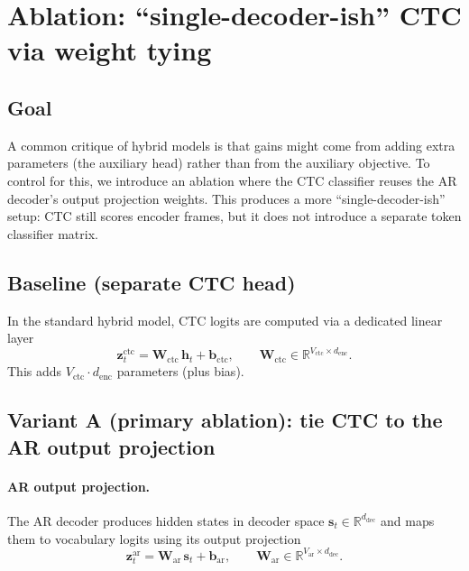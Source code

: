 \section{Ablation: ``single-decoder-ish'' CTC via weight tying}
\label{sec:ctc-weight-tying}

\subsection{Goal}
A common critique of hybrid models is that gains might come from adding extra parameters (the auxiliary head) rather than from the auxiliary objective.
To control for this, we introduce an ablation where the CTC classifier reuses the AR decoder's output projection weights.
This produces a more ``single-decoder-ish'' setup: CTC still scores encoder frames, but it does not introduce a separate token classifier matrix.

\subsection{Baseline (separate CTC head)}
In the standard hybrid model, CTC logits are computed via a dedicated linear layer
\begin{equation}
\mathbf{z}^{\text{ctc}}_t = \mathbf{W}_{\text{ctc}}\, \mathbf{h}_t + \mathbf{b}_{\text{ctc}},
\qquad \mathbf{W}_{\text{ctc}} \in \mathbb{R}^{V_{\text{ctc}} \times d_{\text{enc}}}.
\end{equation}
This adds $V_{\text{ctc}}\cdot d_{\text{enc}}$ parameters (plus bias).

\subsection{Variant A (primary ablation): tie CTC to the AR output projection}
\paragraph{AR output projection.}
The AR decoder produces hidden states in decoder space $\mathbf{s}_t \in \mathbb{R}^{d_{\text{dec}}}$ and maps them to vocabulary logits using its output projection
\begin{equation}
\mathbf{z}^{\text{ar}}_t = \mathbf{W}_{\text{ar}}\, \mathbf{s}_t + \mathbf{b}_{\text{ar}},
\qquad \mathbf{W}_{\text{ar}} \in \mathbb{R}^{V_{\text{ar}} \times d_{\text{dec}}}.
\end{equation}

